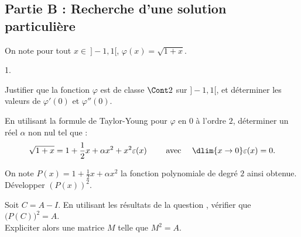 \subsection*{Partie B : Recherche d'une solution particulière}
\noindent
On note pour tout $x\in \ ]-1,1[$, $\varphi(x)=\sqrt{1+x}$.
\begin{noliste}{1.}
  \setcounter{enumi}{3}
\item Justifier que la fonction $\varphi$ est de classe $\Cont 2$ sur 
  $]-1,1[$, et déterminer les valeurs de $\varphi'(0)$ et $\varphi''(0)$.
  
  

\item En utilisant la formule de Taylor-Young pour $\varphi$ en $0$ à
  l'ordre $2$, déterminer un réel $\alpha$ non nul tel que :
  \[
  \sqrt{1+x} = 1 + \frac{1}{2}x + \alpha x^2 + x^2 \varepsilon(x)
  \qquad \mbox{ avec } \quad \dlim{x\to 0} \varepsilon(x) = 0.
  \]
  
  

\item On note $P(x)=1+\frac{1}{2}x+\alpha x^2$ la fonction polynomiale
  de degré $2$ ainsi obtenue. Développer $(P(x))^2$.
  
  
  
  
  
  
\item Soit $C=A-I$. En utilisant les résultats de la question
  , vérifier que $\big(P(C)\big)^2 = A$.\\
  Expliciter alors une matrice $M$ telle que $M^2=A$.
  
  
\end{noliste}


